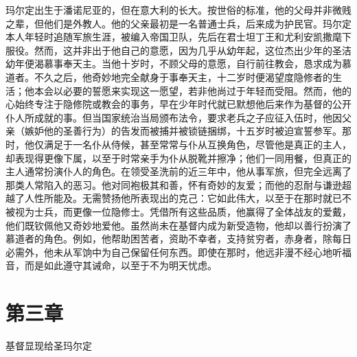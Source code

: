 玛尔定出生于潘诺尼亚的，但在意大利的长大。按世俗的标准，他的父母并非微贱之辈，但他们是外教人。他的父亲最初是一名普通士兵，后来成为护民官。玛尔定本人年轻时追随军旅生涯，被编入帝国卫队，先后在君士坦丁王和尤利安凯撒麾下服役。然而，这并非出于他自己的意愿，因为几乎从幼年起，这位杰出少年的圣洁幼年便渴慕事奉天主。当他十岁时，不顾父母的意愿，自行前往教会，恳求成为慕道者。不久之后，他奇妙地完全献身于事奉天主，十二岁时便渴望度隐修者的生活；他本会以必要的誓愿来实现这一愿望，若非他尚过于年轻而受阻。然而，他的心始终专注于隐修院或教会的事务，早在少年时代就已默想他后来作为基督的公开仆人所成就的事。但当国家统治当局颁布法令，要求老兵之子应征入伍时，他因父亲（嫉妒他的圣善行为）的告发而被捕并被锁链捆绑，十五岁时被迫宣誓参军。那时，他仅满足于一名仆从侍候，甚至常常与仆从互换角色，尽管他是真正的主人，却表现得更像下属，以至于时常亲手为仆从脱靴并擦净；他们一同用餐，但真正的主人通常扮演仆人的角色。在领受圣洗前的近三年中，他从事军旅，但完全远离了那类人常陷入的恶习。他对同袍极其和善，怀有奇妙的友爱；而他的忍耐与谦逊超越了人性所能及。无需赞扬他所表现出的克己：它如此伟大，以至于在那时就已不被视为士兵，而更像一位隐修士。凭借所有这些品质，他赢得了全体战友的爱戴，他们既钦佩他又奇妙地爱他。虽然尚未在基督内成为新受造物，他却以善行扮演了慕道者的角色。例如，他帮助困苦者，资助不幸者，支持贫穷者，赤身者，除每日必需外，他未从军饷中为自己保留任何东西。即使在那时，他远非漫不经心地听福音，而是如此遵守其诫命，以至于不为明天忧虑。\par


\section{第三章}

基督显现给圣玛尔定\par

